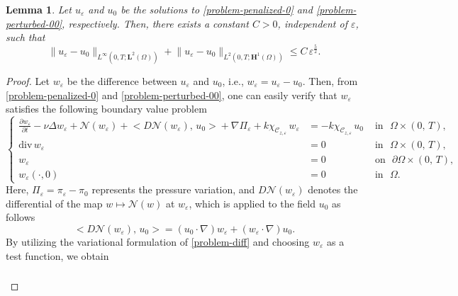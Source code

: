 \documentclass[a4paper,12pt,reqno,natbib]{amsart}
\newtheorem{lemma}[theorem]{Lemma}
\def\N{\mathcal N}
\def\H{\textbf{H}}
\def\L{\textbf{L}}
\begin{document}
\begin{lemma}\label{lemma-es1}
 Let $u_\varepsilon$ and $u_0$ be the solutions to \eqref{problem-penalized-0} and \eqref{problem-perturbed-00}, respectively. Then, there exists a constant $C>0$, independent of $\varepsilon$, such that
\begin{equation}\label{estimation-perturbed-velocity}
\big\|u_\varepsilon-u_0\big\|_{L^\infty(0,T;\L^2(\Omega))}+\big\|u_\varepsilon-u_0\big\|_{L^2(0,T;\H^1(\Omega))}\leq C\, \varepsilon^{\frac{5}{2}}.
\end{equation}
\end{lemma}
\begin{proof}
Let \( w_\varepsilon \) be the difference between \( u_\varepsilon \) and \( u_0 \), i.e., \( w_\varepsilon = u_\varepsilon - u_0 \). Then, from \eqref{problem-penalized-0} and \eqref{problem-perturbed-00}, one can easily verify that \( w_\varepsilon \) satisfies the following boundary value problem
%
\begin{equation}\label{problem-diff}
\left\{
\begin{array}{rll}
\displaystyle \frac {\partial w_\varepsilon}{\partial t}-\nu
\Delta w_\varepsilon+ \N(w_\varepsilon)+\big< D \N(w_\varepsilon),\,u_0 \big> +\nabla \Pi_\varepsilon
 +k\chi_{\mathcal{C}_{z,\varepsilon}}\, w_\varepsilon&= -k\chi_{\mathcal{C}_{z,\varepsilon}}\, u_0 &\mbox{ in }  \,\,\Omega\times (0,\,T) ,\\
\mbox{div}\, w_\varepsilon &=  0 & \mbox{ in } \,\, \Omega \times (0,\,T) ,\\
w_\varepsilon &= 0 & \mbox{ on }\,\,  \partial\Omega \times (0,\,T) , \\
w_\varepsilon(\cdot,0)&= 0&\mbox{ in } \,\,  \Omega.
\end{array}
 \right.
\end{equation}
Here, \( \Pi_\varepsilon = \pi_\varepsilon - \pi_0 \) represents the pressure variation, and \( D\mathcal{N}(w_\varepsilon) \) denotes the differential of the map \( w \mapsto \mathcal{N}(w) \) at \( w_\varepsilon \), which is applied to the field \( u_0 \) as follows
\begin{equation}\label{DN}
   \big< D \N(w_\varepsilon),\,u_0 \big>=(u_0\cdot\nabla )w_\varepsilon + (w_\varepsilon \cdot \nabla)u_0. 
\end{equation}
By utilizing the variational formulation of \eqref{problem-diff} and choosing $w_\varepsilon$ as a test function, we obtain
\begin{align}
\begin{split}\label{estim-R3-1}

\end{split}
\end{align}
\end{proof}
\end{document}
